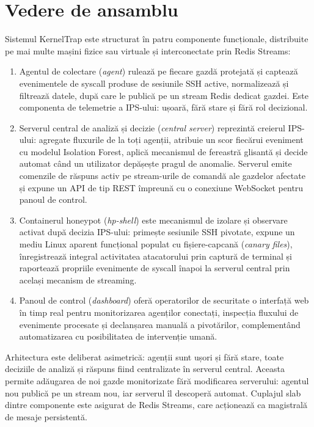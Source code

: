 \section{Vedere de ansamblu}

Sistemul KernelTrap este structurat în patru componente funcționale, distribuite pe mai multe
mașini fizice sau virtuale și interconectate prin Redis Streams:

\begin{enumerate}
  \item Agentul de colectare (\textit{agent}) rulează pe fiecare gazdă protejată și
    captează evenimentele de syscall produse de sesiunile SSH active, normalizează și filtrează
    datele, după care le publică pe un stream Redis dedicat gazdei. Este componenta de
    telemetrie a IPS-ului: ușoară, fără stare și fără rol decizional.

  \item Serverul central de analiză și decizie (\textit{central server}) reprezintă
    creierul IPS-ului: agregate fluxurile de la toți agenții, atribuie un scor fiecărui eveniment cu
    modelul Isolation Forest, aplică mecanismul de fereastră glisantă și decide automat când
    un utilizator depășește pragul de anomalie. Serverul emite comenzile de răspuns activ
    pe stream-urile de comandă ale gazdelor afectate și expune un API de tip REST împreună cu o
    conexiune WebSocket pentru panoul de control.

  \item Containerul honeypot (\textit{hp-shell}) este mecanismul de izolare și
    observare activat după decizia IPS-ului: primește sesiunile SSH pivotate, expune un mediu
    Linux aparent funcțional populat cu fișiere-capcană (\textit{canary files}), înregistrează
    integral activitatea atacatorului prin captură de terminal și raportează propriile evenimente
    de syscall înapoi la serverul central prin același mecanism de streaming.

  \item Panoul de control (\textit{dashboard}) oferă operatorilor de securitate o
    interfață web în timp real pentru monitorizarea agenților conectați, inspecția fluxului de
    evenimente procesate și declanșarea manuală a pivotărilor, complementând automatizarea cu
    posibilitatea de intervenție umană.
\end{enumerate}

Arhitectura este deliberat asimetrică: agenții sunt ușori și fără stare, toate deciziile de
analiză și răspuns fiind centralizate în serverul central. Aceasta permite adăugarea de noi
gazde monitorizate fără modificarea serverului: agentul nou publică pe un stream nou, iar
serverul îl descoperă automat. Cuplajul slab dintre componente este asigurat de Redis Streams,
care acționează ca magistrală de mesaje persistentă.

